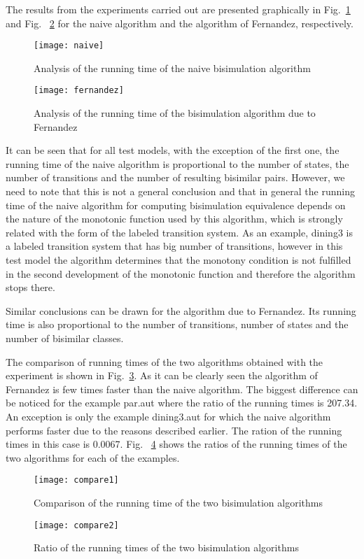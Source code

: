 The results from the experiments carried out are presented graphically in Fig.~\ref{fig:naiveAnalysis} and Fig.~ \ref{fig:fernandezAnalysis} for the naive algorithm and the algorithm of Fernandez, respectively. 

\begin{figure}[h]
\centering
\texttt{[image: naive]}
\caption{Analysis of the running time of the naive bisimulation algorithm}
\label{fig:naiveAnalysis}
\end{figure}

\begin{figure}[h]
\centering
\texttt{[image: fernandez]}
\caption{Analysis of the running time of the bisimulation algorithm due to Fernandez}
\label{fig:fernandezAnalysis}
\end{figure}

It can be seen that for all test models, with the exception of the first one, the running time of the naive algorithm is proportional to the number of states, the number of transitions and the number of resulting bisimilar pairs. However, we need to note that this is not a general conclusion and that in general the running time of the naive algorithm for computing bisimulation equivalence depends on the nature of the monotonic function used by this algorithm, which is strongly related with the form of the labeled transition system. As an example, dining3 is a labeled transition system that has big number of transitions, however in this test model the algorithm determines that the monotony condition is not fulfilled in the second development of the monotonic function and therefore the algorithm stops there.

Similar conclusions can be drawn for the algorithm due to Fernandez. Its running time is also proportional to the number of transitions, number of states and the number of bisimilar classes. 

The comparison of running times of the two algorithms obtained with the experiment is shown in Fig.~\ref{fig:comparison1}. As it can be clearly seen the algorithm of Fernandez is few times faster than the naive algorithm. The biggest difference can be noticed for the example par.aut where the ratio of the running times is 207.34. An exception is only the example dining3.aut for which the naive algorithm performs faster due to the reasons described earlier. The ration of the running times in this case is 0.0067. Fig.~ \ref{fig:comparison2} shows the ratios of the running times of the two algorithms for each of the examples.

\begin{figure}[h]
\centering
\texttt{[image: compare1]}
\caption{Comparison of the running time of the two bisimulation algorithms}
\label{fig:comparison1}
\end{figure}

\begin{figure}[h]
\centering
\texttt{[image: compare2]}
\caption{Ratio of the running times of the two bisimulation algorithms}
\label{fig:comparison2}
\end{figure}